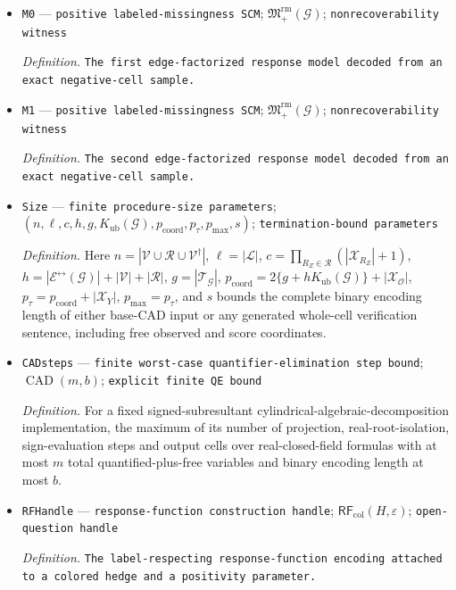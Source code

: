 \documentclass{article}
\begin{document}
\begin{itemize}
  \item \texttt{M0} --- \texttt{positive labeled-\allowbreak{}missingness SCM}; \(\mathfrak M_{+}^{\mathrm{rm}}(\mathcal G)\); \texttt{nonrecoverability witness}
  \par\smallskip\noindent\emph{Definition.} \texttt{The first edge-\allowbreak{}factorized response model decoded from an exact negative-\allowbreak{}cell sample.}
  \item \texttt{M1} --- \texttt{positive labeled-\allowbreak{}missingness SCM}; \(\mathfrak M_{+}^{\mathrm{rm}}(\mathcal G)\); \texttt{nonrecoverability witness}
  \par\smallskip\noindent\emph{Definition.} \texttt{The second edge-\allowbreak{}factorized response model decoded from an exact negative-\allowbreak{}cell sample.}
  \item \texttt{Size} --- \texttt{finite procedure-\allowbreak{}size parameters}; \((n,\ell,c,h,g,K_{\mathrm{ub}}(\mathcal G),p_{\mathrm{coord}},p_{\tau},p_{\max},s)\); \texttt{termination-\allowbreak{}bound parameters}
  \par\smallskip\noindent\emph{Definition.} Here \(n=|\mathcal V\cup\mathcal R\cup\mathcal V^{\dagger}|\), \(\ell=|\mathcal L|\), \(c=\prod_{R_Z\in\mathcal R}(|\mathcal X_{R_Z}|+1)\), \(h=|\mathcal E^{\leftrightarrow}(\mathcal G)|+|\mathcal V|+|\mathcal R|\), \(g=|\mathcal T_{\mathcal G}|\), \(p_{\mathrm{coord}}=2\{g+hK_{\mathrm{ub}}(\mathcal G)\}+|\mathcal X_{\mathcal O}|\), \(p_{\tau}=p_{\mathrm{coord}}+|\mathcal X_Y|\), \(p_{\max}=p_{\tau}\), and \(s\) bounds the complete binary encoding length of either base-CAD input or any generated whole-cell verification sentence, including free observed and score coordinates.
  \item \texttt{CADsteps} --- \texttt{finite worst-\allowbreak{}case quantifier-\allowbreak{}elimination step bound}; \(\operatorname{CAD}(m,b)\); \texttt{explicit finite QE bound}
  \par\smallskip\noindent\emph{Definition.} For a fixed signed-subresultant cylindrical-algebraic-decomposition implementation, the maximum of its number of projection, real-root-isolation, sign-evaluation steps and output cells over real-closed-field formulas with at most \(m\) total quantified-plus-free variables and binary encoding length at most \(b\).
  \item \texttt{RFHandle} --- \texttt{response-\allowbreak{}function construction handle}; \(\mathsf{RF}_{\mathrm{col}}(H,\varepsilon)\); \texttt{open-\allowbreak{}question handle}
  \par\smallskip\noindent\emph{Definition.} \texttt{The label-\allowbreak{}respecting response-\allowbreak{}function encoding attached to a colored hedge and a positivity parameter.}

\end{itemize}
\end{document}
